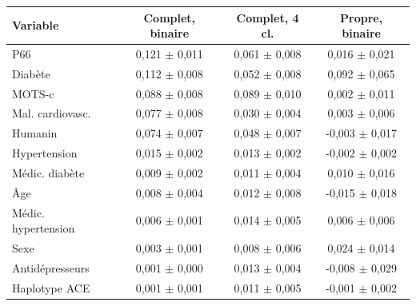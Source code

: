 \begin{tabular}{lccc}
\toprule
Variable & Complet, binaire & Complet, 4 cl. & Propre, binaire \\
\midrule
P66 & 0,121 $\pm$ 0,011 & 0,061 $\pm$ 0,008 & 0,016 $\pm$ 0,021 \\
Diabète & 0,112 $\pm$ 0,008 & 0,052 $\pm$ 0,008 & 0,092 $\pm$ 0,065 \\
MOTS-c & 0,088 $\pm$ 0,008 & 0,089 $\pm$ 0,010 & 0,002 $\pm$ 0,011 \\
Mal. cardiovasc. & 0,077 $\pm$ 0,008 & 0,030 $\pm$ 0,004 & 0,003 $\pm$ 0,006 \\
Humanin & 0,074 $\pm$ 0,007 & 0,048 $\pm$ 0,007 & -0,003 $\pm$ 0,017 \\
Hypertension & 0,015 $\pm$ 0,002 & 0,013 $\pm$ 0,002 & -0,002 $\pm$ 0,002 \\
Médic. diabète & 0,009 $\pm$ 0,002 & 0,011 $\pm$ 0,004 & 0,010 $\pm$ 0,016 \\
Âge & 0,008 $\pm$ 0,004 & 0,012 $\pm$ 0,008 & -0,015 $\pm$ 0,018 \\
Médic. hypertension & 0,006 $\pm$ 0,001 & 0,014 $\pm$ 0,005 & 0,006 $\pm$ 0,006 \\
Sexe & 0,003 $\pm$ 0,001 & 0,008 $\pm$ 0,006 & 0,024 $\pm$ 0,014 \\
Antidépresseurs & 0,001 $\pm$ 0,000 & 0,013 $\pm$ 0,004 & -0,008 $\pm$ 0,029 \\
Haplotype ACE & 0,001 $\pm$ 0,001 & 0,011 $\pm$ 0,005 & -0,001 $\pm$ 0,002 \\
\bottomrule
\end{tabular}